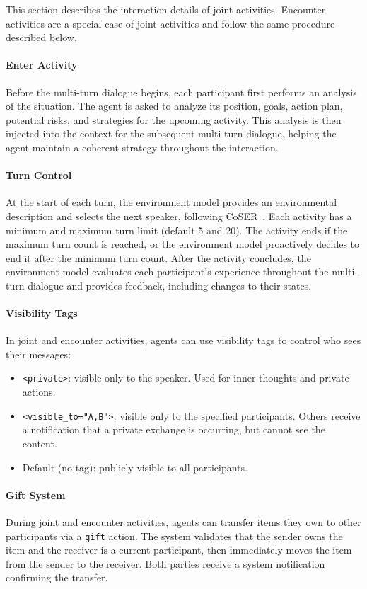 This section describes the interaction details of joint activities.
Encounter activities are a special case of joint activities and follow the same procedure described below.

\paragraph{Enter Activity}
Before the multi-turn dialogue begins, each participant first performs an analysis of the situation.
The agent is asked to analyze its position, goals, action plan, potential risks, and strategies for the upcoming activity.
This analysis is then injected into the context for the subsequent multi-turn dialogue, helping the agent maintain a coherent strategy throughout the interaction.

\paragraph{Turn Control}
At the start of each turn, the environment model provides an environmental description and selects the next speaker, following CoSER~\citep{wang2025coser}.
Each activity has a minimum and maximum turn limit (default 5 and 20).
The activity ends if the maximum turn count is reached, or the environment model proactively decides to end it after the minimum turn count.
After the activity concludes, the environment model evaluates each participant's experience throughout the multi-turn dialogue and provides feedback, including changes to their states.

\paragraph{Visibility Tags}
In joint and encounter activities, agents can use visibility tags to control who sees their messages:
\begin{itemize}[nosep]
\item \texttt{<private>}: visible only to the speaker. Used for inner thoughts and private actions.
\item \texttt{<visible\_to="A,B">}: visible only to the specified participants. Others receive a notification that a private exchange is occurring, but cannot see the content.
\item Default (no tag): publicly visible to all participants.
\end{itemize}

\paragraph{Gift System}
During joint and encounter activities, agents can transfer items they own to other participants via a \texttt{gift} action.
The system validates that the sender owns the item and the receiver is a current participant, then immediately moves the item from the sender to the receiver.
Both parties receive a system notification confirming the transfer.

